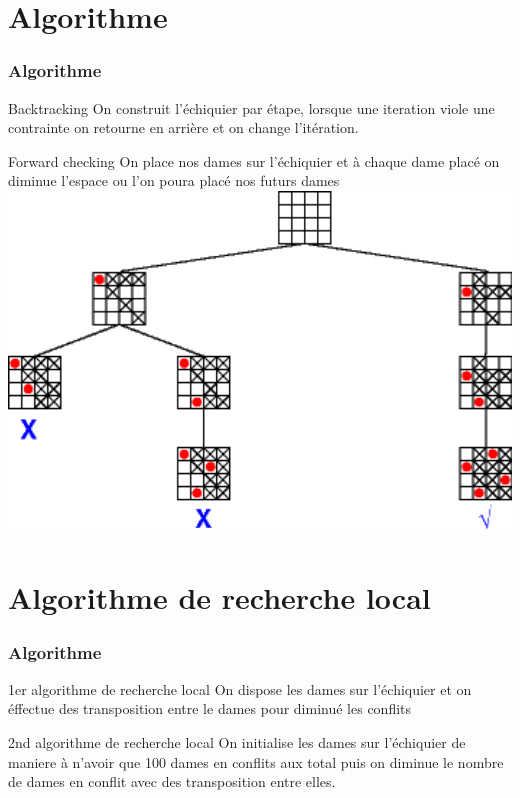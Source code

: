 \documentclass[10pt,a4paper]{beamer}
\begin{document}
\section{Algorithme}
\begin{frame}
	\frametitle{Algorithme}

	\begin{block}{Backtracking}
		On construit l'échiquier par étape, lorsque une iteration viole une contrainte on retourne en arrière et on change l'itération.
	\end{block}



	\begin{block}{Forward checking}
		On place nos dames sur l'échiquier et à chaque dame placé on diminue l'espace ou l'on poura placé nos futurs dames \\
		\includegraphics[width=1\textwidth]{images/forw.png}
	\end{block}

\end{frame}


\section{Algorithme de recherche local}
\begin{frame}
	\frametitle{Algorithme}

	\begin{block}{1er algorithme de recherche local}
		On dispose les dames sur l'échiquier et on éffectue des transposition entre le dames pour diminué les conflits
	\end{block}

	\begin{block}{2nd algorithme de recherche local}
		On initialise les dames sur l'échiquier de maniere à n'avoir que 100 dames en conflits aux total puis on diminue le nombre de dames en conflit avec des transposition entre elles.
	\end{block}


\end{frame}
\end{document}
